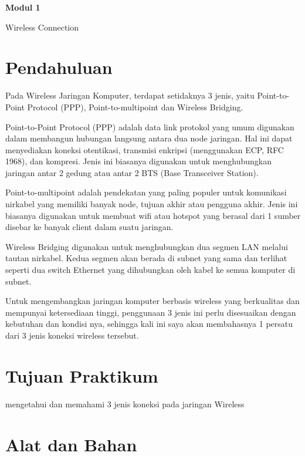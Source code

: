 \newpage
\setcounter{section}{0}
\renewcommand{\thesection}{\arabic{section}}

\begin{center}
    \Huge
    \textbf{Modul 1}
    
    Wireless Connection

\end{center}

\section{Pendahuluan}

Pada Wireless Jaringan Komputer, terdapat setidaknya 3 jenis, yaitu Point-to-Point Protocol
(PPP), Point-to-multipoint dan Wireless Bridging.

Point-to-Point Protocol (PPP) adalah data link protokol yang umum digunakan dalam
membangun hubungan langsung antara dua node jaringan. Hal ini dapat menyediakan koneksi
otentikasi, transmisi enkripsi (menggunakan ECP, RFC 1968), dan kompresi. Jenis ini
biasanya digunakan untuk menghubungkan jaringan antar 2 gedung atau antar 2 BTS (Base
Transceiver Station).

Point-to-multipoint adalah pendekatan yang paling populer untuk komunikasi nirkabel yang
memiliki banyak node, tujuan akhir atau pengguna akhir. Jenis ini biasanya digunakan untuk
membuat wifi atau hotspot yang berasal dari 1 sumber disebar ke banyak client dalam suatu
jaringan.

Wireless Bridging digunakan untuk menghubungkan dua segmen LAN melalui tautan
nirkabel. Kedua segmen akan berada di subnet yang sama dan terlihat seperti dua switch
Ethernet yang dihubungkan oleh kabel ke semua komputer di subnet.

Untuk mengembangkan jaringan komputer berbasis wireless yang berkualitas dan mempunyai
ketersediaan tinggi, penggunaan 3 jenis ini perlu disesuaikan dengan kebutuhan dan kondisi
nya, sehingga kali ini saya akan membahasnya 1 persatu dari 3 jenis koneksi wireless
tersebut.

\section{Tujuan Praktikum}

mengetahui dan memahami 3 jenis koneksi pada jaringan Wireless

\section{Alat dan Bahan}

